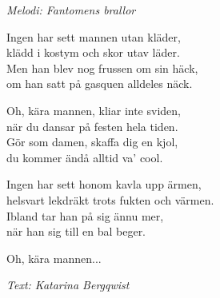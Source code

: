 {\footnotesize\textit{Melodi: Fantomens brallor}}\par
\vspace{10pt}
Ingen har sett mannen utan kläder,\\
klädd i kostym och skor utav läder.\\
Men han blev nog frussen om sin häck,\\
om han satt på gasquen alldeles näck.\par
\vspace{10pt}
Oh, kära mannen, kliar inte sviden,\\
när du dansar på festen hela tiden.\\
Gör som damen, skaffa dig en kjol,\\
du kommer ändå alltid va' cool.\par
\vspace{10pt}
Ingen har sett honom kavla upp ärmen,\\
helsvart lekdräkt trots fukten och värmen.\\
Ibland tar han på sig ännu mer,\\
när han sig till en bal beger.\par
\vspace{10pt}
Oh, kära mannen...\par
\vspace{10pt}
{\footnotesize\textit{Text: Katarina Bergqwist}}
